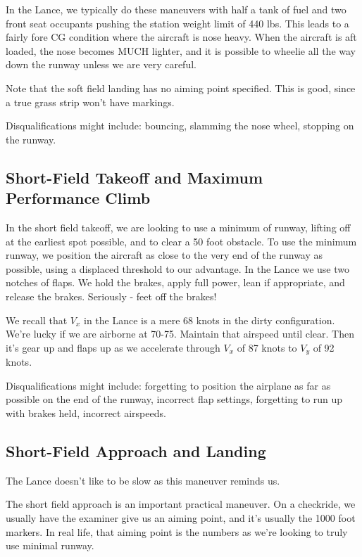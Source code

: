 In the Lance, we typically do these maneuvers with half a tank of fuel and two front seat occupants pushing the station weight limit of 440 lbs. This leads to a fairly fore CG condition where the aircraft is nose heavy. When the aircraft is aft loaded, the nose becomes MUCH lighter, and it is possible to wheelie all the way down the runway unless we are very careful.

Note that the soft field landing has no aiming point specified. This is good, since a true grass strip won't have markings.

Disqualifications might include: bouncing, slamming the nose wheel, stopping on the runway.

\subsection{Short-Field Takeoff and Maximum Performance Climb}

In the short field takeoff, we are looking to use a minimum of runway, lifting off at the earliest spot possible, and to clear a 50 foot obstacle. To use the minimum runway, we position the aircraft as close to the very end of the runway as possible, using a displaced threshold to our advantage. In the Lance we use two notches of flaps. We hold the brakes, apply full power, lean if appropriate, and release the brakes. Seriously - feet off the brakes!

We recall that $V_x$ in the Lance is a mere 68 knots in the dirty configuration. We're lucky if we are airborne at 70-75. Maintain that airspeed until clear. Then it's gear up and flaps up as we accelerate through $V_x$ of 87 knots to $V_y$ of 92 knots.

Disqualifications might include: forgetting to position the airplane as far as possible on the end of the runway, incorrect flap settings, forgetting to run up with brakes held, incorrect airspeeds.

\subsection{Short-Field Approach and Landing}

The Lance doesn't like to be slow as this maneuver reminds us.

The short field approach is an important practical maneuver. On a checkride, we usually have the examiner give us an aiming point, and it's usually the 1000 foot markers. In real life, that aiming point is the numbers as we're looking to truly use minimal runway.

